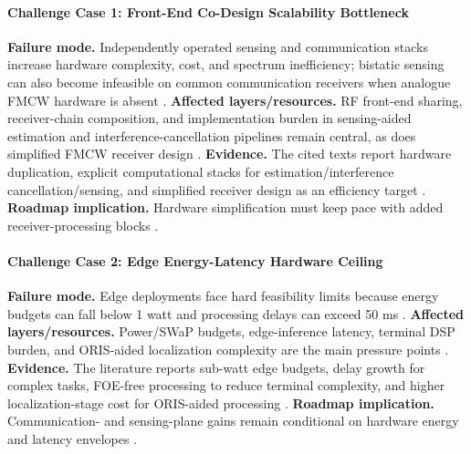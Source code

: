 \documentclass[letterpaper,journal]{IEEEtran}
\begin{document}
\paragraph{Challenge Case 1: Front-End Co-Design Scalability Bottleneck}
\textbf{Failure mode.} Independently operated sensing and communication stacks increase hardware complexity, cost, and spectrum inefficiency; bistatic sensing can also become infeasible on common communication receivers when analogue FMCW hardware is absent \cite{O_ISAC_237}. \textbf{Affected layers/resources.} RF front-end sharing, receiver-chain composition, and implementation burden in sensing-aided estimation and interference-cancellation pipelines remain central, as does simplified FMCW receiver design \cite{O_ISAC_237, O_ISAC_035}. \textbf{Evidence.} The cited texts report hardware duplication, explicit computational stacks for estimation/interference cancellation/sensing, and simplified receiver design as an efficiency target \cite{O_ISAC_237, O_ISAC_035}. \textbf{Roadmap implication.} Hardware simplification must keep pace with added receiver-processing blocks \cite{O_ISAC_237, O_ISAC_035}.

\paragraph{Challenge Case 2: Edge Energy-Latency Hardware Ceiling}
\textbf{Failure mode.} Edge deployments face hard feasibility limits because energy budgets can fall below 1 watt and processing delays can exceed 50 ms \cite{O_ISAC_093}. \textbf{Affected layers/resources.} Power/SWaP budgets, edge-inference latency, terminal DSP burden, and ORIS-aided localization complexity are the main pressure points \cite{O_ISAC_093, O_ISAC_095, O_ISAC_112}. \textbf{Evidence.} The literature reports sub-watt edge budgets, delay growth for complex tasks, FOE-free processing to reduce terminal complexity, and higher localization-stage cost for ORIS-aided processing \cite{O_ISAC_093, O_ISAC_095, O_ISAC_112}. \textbf{Roadmap implication.} Communication- and sensing-plane gains remain conditional on hardware energy and latency envelopes \cite{O_ISAC_093, O_ISAC_095, O_ISAC_112}.
\end{document}
